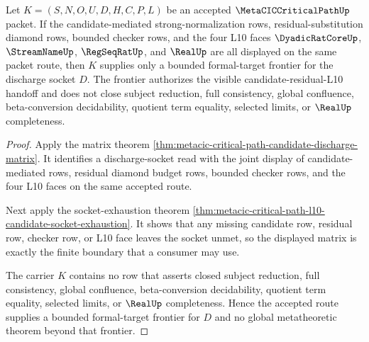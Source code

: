 \begin{theorem}
\label{thm:metacic-critical-path-candidate-discharge-matrix-frontier}
Let $K=(S,N,O,U,D,H,C,P,L)$ be an accepted $\MetaCICCriticalPathUp$ packet. If the candidate-mediated strong-normalization rows, residual-substitution diamond rows, bounded checker rows, and the four L10 faces $\DyadicRatCoreUp$, $\StreamNameUp$, $\RegSeqRatUp$, and $\RealUp$ are all displayed on the same packet route, then $K$ supplies only a bounded formal-target frontier for the discharge socket $D$. The frontier authorizes the visible candidate-residual-L10 handoff and does not close subject reduction, full consistency, global confluence, beta-conversion decidability, quotient term equality, selected limits, or $\RealUp$ completeness.
\end{theorem}
\begin{proof}
Apply the matrix theorem \autoref{thm:metacic-critical-path-candidate-discharge-matrix}. It identifies a discharge-socket read with the joint display of candidate-mediated rows, residual diamond budget rows, bounded checker rows, and the four L10 faces on the same accepted route.

Next apply the socket-exhaustion theorem \autoref{thm:metacic-critical-path-l10-candidate-socket-exhaustion}. It shows that any missing candidate row, residual row, checker row, or L10 face leaves the socket unmet, so the displayed matrix is exactly the finite boundary that a consumer may use.

The carrier $K$ contains no row that asserts closed subject reduction, full consistency, global confluence, beta-conversion decidability, quotient term equality, selected limits, or $\RealUp$ completeness. Hence the accepted route supplies a bounded formal-target frontier for $D$ and no global metatheoretic theorem beyond that frontier.
\end{proof}

